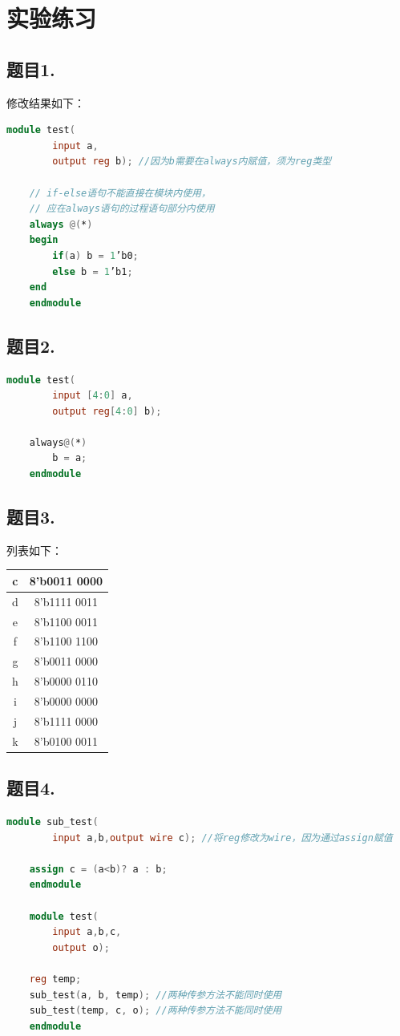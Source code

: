 \documentclass[UTF8]{article}
\begin{document}
	
	\section{实验练习}
	\subsection{题目1.}
	修改结果如下：
	\begin{lstlisting}[language = Verilog]
	module test(
		input a,
		output reg b); //因为b需要在always内赋值，须为reg类型
		
	// if-else语句不能直接在模块内使用，
	// 应在always语句的过程语句部分内使用
	always @(*)
	begin
		if(a) b = 1’b0;
		else b = 1’b1;
	end
	endmodule
	\end{lstlisting}
	
	
	
	\subsection{题目2.}
	\begin{lstlisting}[language = Verilog]
	module test(
		input [4:0] a,
		output reg[4:0] b);
		
	always@(*)
		b = a;
	endmodule
	\end{lstlisting}
	
	
	
	\subsection{题目3.}
	列表如下：\par
	\begin{tabular}{|c|c|}
		\hline 
		c & 8'b0011 0000 \\ 
		\hline 
		d & 8'b1111 0011 \\ 
		\hline 
		e &  8'b1100 0011\\ 
		\hline 
		f &  8'b1100 1100\\ 
		\hline 
		g &  8'b0011 0000\\ 
		\hline 
		h &  8'b0000 0110\\ 
		\hline 
		i &  8'b0000 0000\\ 
		\hline 
		j &  8'b1111 0000\\ 
		\hline 
		k &  8'b0100 0011\\ 
		\hline 
	\end{tabular} 



	\subsection{题目4.}
	\begin{lstlisting}[language = Verilog]
	module sub_test(
		input a,b,output wire c); //将reg修改为wire，因为通过assign赋值
		
	assign c = (a<b)? a : b;
	endmodule
	
	module test(
		input a,b,c,
		output o);
		
	reg temp;
	sub_test(a, b, temp); //两种传参方法不能同时使用
	sub_test(temp, c, o); //两种传参方法不能同时使用
	endmodule
	\end{lstlisting}
	
\end{document}
